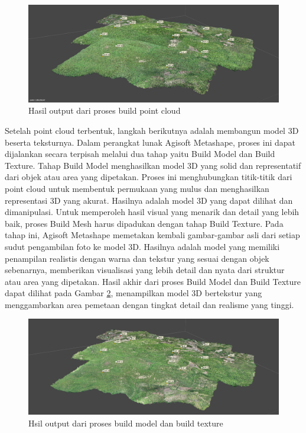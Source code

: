 \begin{figure} [H]
    \centering
    \includegraphics[width=1\linewidth]{image/point cloude.png}
    \caption{Hasil output dari proses build point cloud}
    \label{point cloude}
\end{figure}

\par Setelah point cloud terbentuk, langkah berikutnya adalah membangun model 3D beserta teksturnya. Dalam perangkat lunak Agisoft Metashape, proses ini dapat dijalankan secara terpisah melalui dua tahap yaitu Build Model dan Build Texture. Tahap Build Model menghasilkan model 3D yang solid dan representatif dari objek atau area yang dipetakan. Proses ini menghubungkan titik-titik dari point cloud untuk membentuk permukaan yang mulus dan menghasilkan representasi 3D yang akurat. Hasilnya adalah model 3D yang dapat dilihat dan dimanipulasi. Untuk memperoleh hasil visual yang menarik dan detail yang lebih baik, proses Build Mesh harus dipadukan dengan tahap Build Texture. Pada tahap ini, Agisoft Metashape memetakan kembali gambar-gambar asli dari setiap sudut pengambilan foto ke model 3D. Hasilnya adalah model yang memiliki penampilan realistis dengan warna dan tekstur yang sesuai dengan objek sebenarnya, memberikan visualisasi yang lebih detail dan nyata dari struktur atau area yang dipetakan. Hasil akhir dari proses Build Model dan Build Texture dapat dilihat pada Gambar \ref{model3d}, menampilkan model 3D bertekstur yang menggambarkan area pemetaan dengan tingkat detail dan realisme yang tinggi.

\begin{figure} [H]
    \centering
    \includegraphics[width=1\linewidth]{image/Tampilan 3d model.png}
    \caption{Hsil output dari proses build model dan build texture}
    \label{model3d}
\end{figure}

